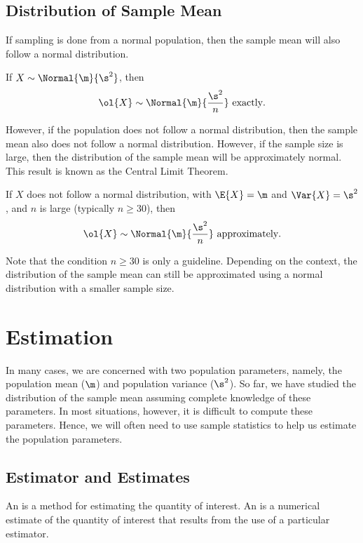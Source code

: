 \subsection{Distribution of Sample Mean}

If sampling is done from a normal population, then the sample mean will also follow a normal distribution.

\begin{proposition}
    If $X \sim \Normal{\m}{\s^2}$, then \[\ol{X} \sim \Normal{\m}{\frac{\s^2}{n}} \text{ exactly}.\]
\end{proposition}

However, if the population does not follow a normal distribution, then the sample mean also does not follow a normal distribution. However, if the sample size is large, then the distribution of the sample mean will be approximately normal. This result is known as the Central Limit Theorem.

\begin{theorem}
    If $X$ does not follow a normal distribution, with $\E{X} = \m$ and $\Var{X} = \s^2$, and $n$ is large (typically $n \geq 30$), then \[\ol{X} \sim \Normal{\m}{\frac{\s^2}{n}} \text{ approximately}.\]
\end{theorem}

Note that the condition $n \geq 30$ is only a guideline. Depending on the context, the distribution of the sample mean can still be approximated using a normal distribution with a smaller sample size.

\section{Estimation}

In many cases, we are concerned with two population parameters, namely, the population mean ($\m$) and population variance ($\s^2$). So far, we have studied the distribution of the sample mean assuming complete knowledge of these parameters. In most situations, however, it is difficult to compute these parameters. Hence, we will often need to use sample statistics to help us estimate the population parameters.

\subsection{Estimator and Estimates}

\begin{definition}
    An  is a method for estimating the quantity of interest. An  is a numerical estimate of the quantity of interest that results from the use of a particular estimator.
\end{definition}

